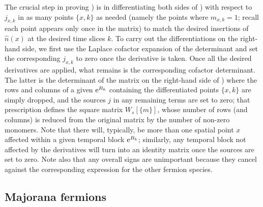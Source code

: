 \documentclass[../main.tex]{subfiles}
\begin{document}
The crucial step in proving ) is in differentiating both sides of ) with respect to $j_{x,k}$ in as
many points $\{x,k\}$ as needed (namely the points where $m_{x,k} = 1$; recall each point appears only once in the matrix) to match the desired insertions of
$\hat n(x)$ at the desired time slices $k$.
To carry out the differentiations on the right-hand side, we first use the Laplace cofactor expansion of the determinant and
set the corresponding $j_{x,k}$ to zero once the derivative is taken. Once all the desired derivatives are applied, what remains is the corresponding cofactor
determinant. The latter is the determinant of the matrix on the right-hand side of ) where the rows and columns
of a given ${\rm e}^{B_k}$ containing the differentiated points $\{x,k\}$ are simply dropped, and the sources $j$ in any remaining terms are set to zero; that
prescription defines the square matrix $W_s[\{m\}]$, whose number of rows (and columns) is reduced from the original matrix by the number of non-zero monomers.
Note that there will, typically, be more than one spatial point $x$ affected within a given temporal block ${\rm e}^{B_k}$; similarly,
any temporal block not affected by the derivatives will turn into an identity matrix once the sources are set to zero.
Note also that any overall signs are unimportant because they cancel against the corresponding expression for the other fermion species.


\subsection{Majorana fermions~\label{sect:Majorana}}
\end{document}
